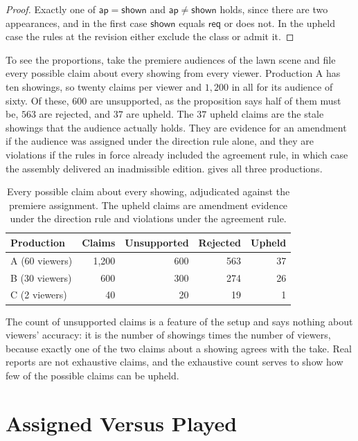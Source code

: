 \documentclass[11pt,twoside,openright]{book}
\theoremstyle{plain}
\theoremstyle{definition}
\theoremstyle{remark}
\begin{document}
\begin{proof}
Exactly one of $\mathsf{ap}=\mathsf{shown}$ and $\mathsf{ap}\neq\mathsf{shown}$ holds, since there are two appearances, and in the first case $\mathsf{shown}$ equals $\mathsf{req}$ or does not. In the upheld case the rules at the revision either exclude the class or admit it.
\end{proof}

To see the proportions, take the premiere audiences of the lawn scene and file every possible claim about every showing from every viewer. Production A has ten showings, so twenty claims per viewer and $1{,}200$ in all for its audience of sixty. Of these, $600$ are unsupported, as the proposition says half of them must be, $563$ are rejected, and $37$ are upheld. The $37$ upheld claims are the stale showings that the audience actually holds. They are evidence for an amendment if the audience was assigned under the direction rule alone, and they are violations if the rules in force already included the agreement rule, in which case the assembly delivered an inadmissible edition.  gives all three productions.

\begin{table}[ht]
\centering
\begin{tabular}{@{}lrrrr@{}}
\toprule
Production & Claims & Unsupported & Rejected & Upheld\\
\midrule
A (60 viewers) & 1,200 & 600 & 563 & 37\\
B (30 viewers) & 600 & 300 & 274 & 26\\
C (2 viewers) & 40 & 20 & 19 & 1\\
\bottomrule
\end{tabular}
\caption{Every possible claim about every showing, adjudicated against the premiere assignment. The upheld claims are amendment evidence under the direction rule and violations under the agreement rule.}\label{tab:verdicts}
\end{table}

The count of unsupported claims is a feature of the setup and says nothing about viewers' accuracy: it is the number of showings times the number of viewers, because exactly one of the two claims about a showing agrees with the take. Real reports are not exhaustive claims, and the exhaustive count serves to show how few of the possible claims can be upheld.

\section{Assigned Versus Played}\label{sec:played}
\end{document}
